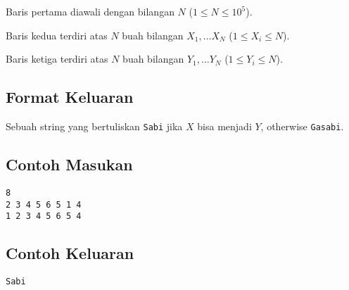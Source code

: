 \documentclass{article}
\begin{document}


Baris pertama diawali dengan bilangan $N$ ($1 \leq N \leq 10^5$).

Baris kedua terdiri atas $N$ buah bilangan $X_1, \dots X_N$ ($1 \leq X_i \leq N$).

Baris ketiga terdiri atas $N$ buah bilangan $Y_1, \dots Y_N$ ($1 \leq Y_i \leq N$).

\subsection*{Format Keluaran}

Sebuah string yang bertuliskan \lstinline{Sabi} jika $X$ bisa menjadi $Y$, otherwise \lstinline{Gasabi}.
\\

\begin{multicols}{2}
\subsection*{Contoh Masukan}
\begin{lstlisting}
8
2 3 4 5 6 5 1 4
1 2 3 4 5 6 5 4
\end{lstlisting}
\columnbreak
\subsection*{Contoh Keluaran}
\begin{lstlisting}
Sabi
\end{lstlisting}
\vfill
\null
\end{multicols}


\pagebreak
\end{document}
